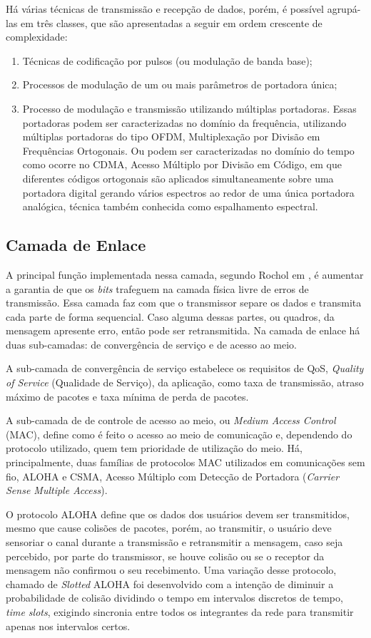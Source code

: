 Há várias técnicas de transmissão e recepção de dados, porém, é possível agrupá-las em três classes, que são apresentadas a seguir em ordem crescente de complexidade:
\begin{enumerate}
	\item Técnicas de codificação por pulsos (ou modulação de banda base);
	\item Processos de modulação de um ou mais parâmetros de portadora única;
	\item Processo de modulação e transmissão utilizando múltiplas portadoras. Essas portadoras podem ser caracterizadas no domínio da frequência, utilizando múltiplas portadoras do tipo OFDM, Multiplexação por Divisão em Frequências Ortogonais. Ou podem ser caracterizadas no domínio do tempo como ocorre no CDMA, Acesso Múltiplo por Divisão em Código, em que diferentes códigos ortogonais são aplicados simultaneamente sobre uma portadora digital gerando vários espectros ao redor de uma única portadora analógica, técnica também conhecida como espalhamento espectral.
\end{enumerate}

\subsection{Camada de Enlace}
A principal função implementada nessa camada, segundo Rochol em \cite{rochol2018sistemas}, é aumentar a garantia de que os \emph{bits} trafeguem na camada física livre de erros de transmissão. Essa camada faz com que o transmissor separe os dados e transmita cada parte de forma sequencial. Caso alguma dessas partes, ou quadros, da mensagem apresente erro, então pode ser retransmitida. Na camada de enlace há duas sub-camadas: de convergência de serviço e de acesso ao meio.

A sub-camada de convergência de serviço estabelece os requisitos de QoS, \emph{Quality of Service} (Qualidade de Serviço), da aplicação, como taxa de transmissão, atraso máximo de pacotes e taxa mínima de perda de pacotes.

A sub-camada de de controle de acesso ao meio, ou \emph{Medium Access Control} (MAC), define como é feito o acesso ao meio de comunicação e, dependendo do protocolo utilizado, quem tem prioridade de utilização do meio. Há, principalmente, duas famílias de protocolos MAC utilizados em comunicações sem fio, ALOHA e CSMA, Acesso Múltiplo com Detecção de Portadora (\emph{Carrier Sense Multiple Access}).

O protocolo ALOHA define que os dados dos usuários devem ser transmitidos, mesmo que cause colisões de pacotes, porém, ao transmitir, o usuário deve sensoriar o canal durante a transmissão e retransmitir a mensagem, caso seja percebido, por parte do transmissor, se houve colisão ou se o receptor da mensagem não confirmou o seu recebimento. Uma variação desse protocolo, chamado de \emph{Slotted} ALOHA foi desenvolvido com a intenção de diminuir a probabilidade de colisão dividindo o tempo em intervalos discretos de tempo, \emph{time slots}, exigindo sincronia entre todos os integrantes da rede para transmitir apenas nos intervalos certos.

